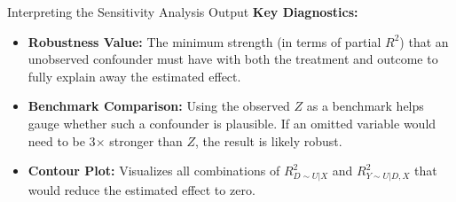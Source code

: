 \documentclass[aspectratio=169, handout, t]{beamer}
\numberwithin{equation}{section}
\begin{document}
\begin{frame}{Interpreting the Sensitivity Analysis Output}
\textbf{Key Diagnostics:}
\begin{itemize}
    \item \textbf{Robustness Value:} The minimum strength (in terms of partial \(R^2\)) that an unobserved confounder must have with both the treatment and outcome to fully explain away the estimated effect.
    \item \textbf{Benchmark Comparison:} Using the observed \(Z\) as a benchmark helps gauge whether such a confounder is plausible. If an omitted variable would need to be 3$\times$ stronger than \(Z\), the result is likely robust.
    \item \textbf{Contour Plot:} Visualizes all combinations of $R^2_{D\sim U|X}$ and $R^2_{Y\sim U|D,X}$ that would reduce the estimated effect to zero.
\end{itemize}
\end{frame}
\end{document}
